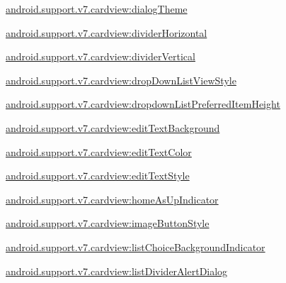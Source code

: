 {\ttfamily \hyperlink{classandroid_1_1support_1_1v7_1_1cardview_1_1R_1_1styleable_a75ef082c5a516f8dbdbfe7ada1a403ec}{android.\+support.\+v7.\+cardview\+:dialog\+Theme}}

{\ttfamily \hyperlink{classandroid_1_1support_1_1v7_1_1cardview_1_1R_1_1styleable_ab43c9135bab4d1f11e5da417725ca828}{android.\+support.\+v7.\+cardview\+:divider\+Horizontal}}

{\ttfamily \hyperlink{classandroid_1_1support_1_1v7_1_1cardview_1_1R_1_1styleable_a0c1aaaa486728e1316ec4549d70827f9}{android.\+support.\+v7.\+cardview\+:divider\+Vertical}}

{\ttfamily \hyperlink{classandroid_1_1support_1_1v7_1_1cardview_1_1R_1_1styleable_a9d95b8b96fc0c33fe2ccdbca4bb4c766}{android.\+support.\+v7.\+cardview\+:drop\+Down\+List\+View\+Style}}

{\ttfamily \hyperlink{classandroid_1_1support_1_1v7_1_1cardview_1_1R_1_1styleable_afaa8a297c466030001f56355b8189813}{android.\+support.\+v7.\+cardview\+:dropdown\+List\+Preferred\+Item\+Height}}

{\ttfamily \hyperlink{classandroid_1_1support_1_1v7_1_1cardview_1_1R_1_1styleable_a4aa486808b398010c0add74652864333}{android.\+support.\+v7.\+cardview\+:edit\+Text\+Background}}

{\ttfamily \hyperlink{classandroid_1_1support_1_1v7_1_1cardview_1_1R_1_1styleable_ac460822fecf040d46fdef2df0935686e}{android.\+support.\+v7.\+cardview\+:edit\+Text\+Color}}

{\ttfamily \hyperlink{classandroid_1_1support_1_1v7_1_1cardview_1_1R_1_1styleable_aa67cb5a7db3afa80cebeb9fad0404dff}{android.\+support.\+v7.\+cardview\+:edit\+Text\+Style}}

{\ttfamily \hyperlink{classandroid_1_1support_1_1v7_1_1cardview_1_1R_1_1styleable_a2e70ceeae7e1d05bbc4fc942d0a8f7c5}{android.\+support.\+v7.\+cardview\+:home\+As\+Up\+Indicator}}

{\ttfamily \hyperlink{classandroid_1_1support_1_1v7_1_1cardview_1_1R_1_1styleable_a72b5ca7a1aac1855262c99759b66331b}{android.\+support.\+v7.\+cardview\+:image\+Button\+Style}}

{\ttfamily \hyperlink{classandroid_1_1support_1_1v7_1_1cardview_1_1R_1_1styleable_ad2bb60a20b18a930a128f24c8459db7b}{android.\+support.\+v7.\+cardview\+:list\+Choice\+Background\+Indicator}}

{\ttfamily \hyperlink{classandroid_1_1support_1_1v7_1_1cardview_1_1R_1_1styleable_a3b67d0da8fefb257707bd3d70e79ba96}{android.\+support.\+v7.\+cardview\+:list\+Divider\+Alert\+Dialog}}


